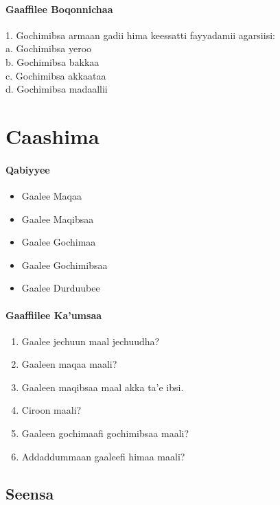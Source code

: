 \documentclass[11pt,b5paper]{book}
\begin{document}
\subsubsection{Gaaffilee Boqonnichaa}
1. Gochimibsa armaan gadii hima keessatti fayyadamii agarsiisi:\\
a. Gochimibsa yeroo\\
b. Gochimibsa bakkaa\\
c. Gochimibsa akkaataa\\
d. Gochimibsa madaallii\\

\newpage

\chapter{Caashima}
\subsubsection{Qabiyyee}
\begin{itemize}
	\item Gaalee Maqaa
	\item Gaalee Maqibsaa
	\item Gaalee Gochimaa
	\item Gaalee Gochimibsaa
	\item Gaalee Durduubee
\end{itemize}
\subsubsection{Gaaffiilee Ka'umsaa}
\begin{enumerate}
	\item Gaalee jechuun maal jechuudha?
	\item Gaaleen maqaa maali?
	\item Gaaleen maqibsaa maal akka ta'e ibsi.
	\item Ciroon maali?
	\item Gaaleen gochimaafi gochimibsaa maali?
	\item Addaddummaan gaaleefi himaa maali?
\end{enumerate}
	
	\section{Seensa}
	
\end{document}
